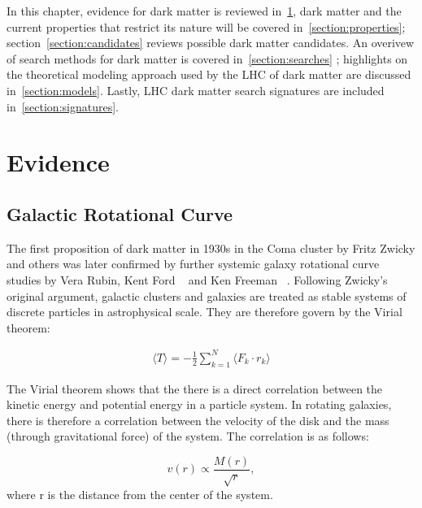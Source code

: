     In this chapter, evidence for dark matter is reviewed in~\ref{section:evidence}, dark matter and the current properties that restrict its nature will be covered in~\ref{section:properties}; section~\ref{section:candidates} reviews possible dark matter candidates. An overivew of search methods for dark matter is covered in~\ref{section:searches} ; highlights on the theoretical modeling approach used by the LHC of dark matter are discussed in~\ref{section:models}. Lastly, LHC dark matter search signatures are included in~\ref{section:signatures}.

\section{Evidence}
\label{section:evidence}

\subsection{Galactic Rotational Curve}
    The first proposition of dark matter in 1930s in the Coma cluster by Fritz Zwicky and others was later confirmed by further systemic galaxy rotational curve studies by Vera Rubin, Kent Ford ~\cite{Rubin} and Ken Freeman ~\cite{freeman}.  
    Following Zwicky's original argument, galactic clusters and galaxies are treated as stable systems of discrete particles in astrophysical scale. They are therefore govern by the Virial theorem:
%

\begin{align}
\begin{equation}
     \langle T \rangle = -\frac{1}{2} \sum_{k=1}^{N} \langle F_{k} \cdot r_{k} \rangle
    \label{eq:virial}

\end{equation}
\end{align}


    The Virial theorem shows that the there is a direct correlation between the kinetic energy and potential energy in a particle system. In rotating galaxies, there is therefore a correlation between the velocity of the disk and the mass (through gravitational force) of the system. The correlation is as follows: 
    
     $$ v(r) \varpropto \frac{M(r)}{\sqrt{r}}, $$ where r is the distance from the center of the system.


